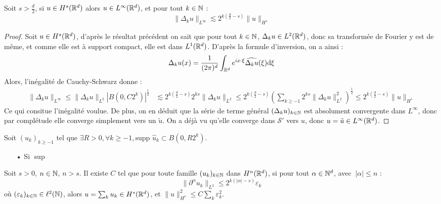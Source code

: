 \documentclass[11pt,a4paper]{article}
\begin{document}
\begin{lemma}\label{inject}
Soit $s>\frac{d}{2}$, si $u\in H^s(\mathbb R^d)$ alors $u\in L^\infty(\mathbb R^d)$, et pour tout $k\in \mathbb N$ :
\begin{equation*}
\|\Delta_ku\|_{L^\infty} \lesssim 2^{k(\frac{d}{2}-s)} \|u\|_{H^s}
\end{equation*}
\end{lemma}


\begin{proof}
Soit $u\in H^s(\mathbb R^d)$, d'après le résultat précédent on sait que pour tout $k\in \mathbb N$, $\Delta_ku\in L^2(\mathbb R^d)$, donc sa transformée de Fourier y est de même, et comme elle est à support compact, elle est dans $L^1(\mathbb R^d)$. D'après la formule d'inversion, on a ainsi : 
\begin{equation*}
\Delta_ku(x) = \frac{1}{(2\pi)^d}\int_{\mathbb R^d} e^{i x\cdot \xi} \widehat{\Delta_ku}(\xi)\mathrm{d}\xi
\end{equation*}
Alors, l'inégalité de Cauchy-Schwarz donne :
\begin{align*}
\|\Delta_ku\|_{L^\infty} \leq \|\Delta_ku\|_{L^2} \left|B(0,C 2^k) \right| ^\frac{1}{2} &\lesssim 2^{k(\frac{d}{2}-s)} 2^{ks}\|\Delta_ku\|_{L^2} \leq 2^{k(\frac{d}{2}-s)} (\sum_{k\geq -1} 2^{ks}\|\Delta_ku\|^2_{L^2})^{\frac{1}{2}} \leq 2^{k(\frac{d}{2}-s)} \|u\|_{H^s}
\end{align*}
Ce qui consitue l'inégalité voulue. De plus, on en déduit que la série de terme général $(\Delta_ku)_{k\in \mathbb N}$ est absolument convergente dans $L^\infty$, donc par complétude elle converge simplement vers un $\tilde{u}$. On a déjà vu qu'elle converge dans $\mathcal{S}'$ vers $u$, donc $u=\tilde{u} \in L^\infty(\mathbb R^d)$.
\end{proof}


\begin{prop}\label{spec_ball}
Soit $(u_k)_{k\geq -1}$ tel que $\exists R >0, \forall k\geq -1, \text{supp }\hat{u}_k \subset B(0,R2^k)$.
\begin{itemize}
\item[•]Si $\sup $
\end{itemize}
\end{prop}


\begin{prop}[]\label{meyer}
Soit $s>0$, $n\in \mathbb N$, $n>s$. Il existe $C$ tel que pour toute famille $(u_k)_{k\in \mathbb N}$ dans $H^n(\mathbb R^d)$, si pour tout $\alpha \in \mathbb N^d$, avec $\ |\alpha| \leq n $ :
\begin{equation*}
\|\partial ^\alpha u_k \|_{L^2} \leq 2^{k(|\alpha|-s)}\varepsilon_k
\end{equation*}
où $(\varepsilon_k)_{k\in \mathbb N} \in \ell^2(\mathbb N)$, alors $u=\sum_k u_k \in H^s(\mathbb R^d) $, et $ \|u\|_{H^s}^2 \leq C \sum_k \varepsilon_k^2 $.
\end{prop}
\end{document}
